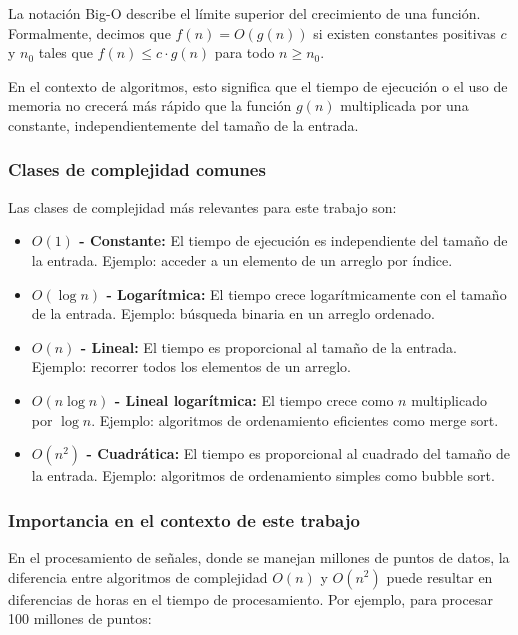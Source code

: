 \documentclass[12pt,a4paper]{article}
\begin{document}
La notación Big-O describe el límite superior del crecimiento de una función. Formalmente, decimos que $f(n) = O(g(n))$ si existen constantes positivas $c$ y $n_0$ tales que $f(n) \leq c \cdot g(n)$ para todo $n \geq n_0$.

En el contexto de algoritmos, esto significa que el tiempo de ejecución o el uso de memoria no crecerá más rápido que la función $g(n)$ multiplicada por una constante, independientemente del tamaño de la entrada.

\subsubsection{Clases de complejidad comunes}

Las clases de complejidad más relevantes para este trabajo son:

\begin{itemize}
    \item \textbf{$O(1)$ - Constante:} El tiempo de ejecución es independiente del tamaño de la entrada. Ejemplo: acceder a un elemento de un arreglo por índice.
    
    \item \textbf{$O(\log n)$ - Logarítmica:} El tiempo crece logarítmicamente con el tamaño de la entrada. Ejemplo: búsqueda binaria en un arreglo ordenado.
    
    \item \textbf{$O(n)$ - Lineal:} El tiempo es proporcional al tamaño de la entrada. Ejemplo: recorrer todos los elementos de un arreglo.
    
    \item \textbf{$O(n \log n)$ - Lineal logarítmica:} El tiempo crece como $n$ multiplicado por $\log n$. Ejemplo: algoritmos de ordenamiento eficientes como merge sort.
    
    \item \textbf{$O(n^2)$ - Cuadrática:} El tiempo es proporcional al cuadrado del tamaño de la entrada. Ejemplo: algoritmos de ordenamiento simples como bubble sort.
\end{itemize}

\subsubsection{Importancia en el contexto de este trabajo}

En el procesamiento de señales, donde se manejan millones de puntos de datos, la diferencia entre algoritmos de complejidad $O(n)$ y $O(n^2)$ puede resultar en diferencias de horas en el tiempo de procesamiento. Por ejemplo, para procesar 100 millones de puntos:
\end{document}
